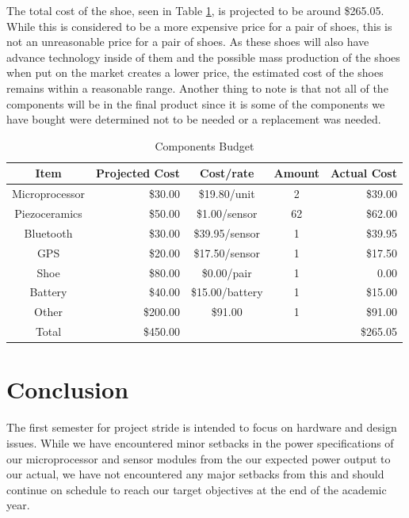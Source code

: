 \documentclass[letterpaper, 12 pt, onecolumn, hidelinks]{ieeetran}
\begin{document}
The total cost of the shoe, seen in Table \ref{table:Components}, is projected to be around \$265.05. While this is considered to be a more expensive price for a pair of shoes, this is not an unreasonable price for a pair of shoes. As these shoes will also have advance technology inside of them and the possible mass production of the shoes when put on the market creates a lower price, the estimated cost of the shoes remains within a reasonable range. Another thing to note is that not all of the components will be in the final product since it is some of the components we have bought were determined not to be needed or a replacement was needed.

\begin{table}[h!]
	\caption{\label{table:Components}Components Budget}
	\begin{center}
		\begin{tabular}{ c|r c c r } 
			Item & Projected Cost & Cost/rate & Amount & Actual Cost \\
			\hline
			Microprocessor & \$30.00 & \$19.80/unit & 2 & \$39.00 \\ 
			Piezoceramics & \$50.00 & \$1.00/sensor & 62 & \$62.00 \\ 
			Bluetooth & \$30.00 & \$39.95/sensor & 1 & \$39.95 \\ 
			GPS & \$20.00 & \$17.50/sensor & 1 & \$17.50 \\ 
			Shoe & \$80.00 & \$0.00/pair & 1 & 0.00 \\ 
			Battery & \$40.00 & \$15.00/battery & 1 & \$15.00 \\ 
			Other & \$200.00 & \$91.00 & 1 & \$91.00 \\ 
			\hline
			Total & \$450.00 &  &  & \$265.05 \\
		\end{tabular}
	\end{center} 
\end{table}

\section{Conclusion}\label{sec:Conclusion}
The first semester for project stride is intended to focus on hardware and design issues. While we have encountered minor setbacks in the power specifications of our microprocessor and sensor modules from the our expected power output to our actual, we have not encountered any major setbacks from this and should continue on schedule to reach our target objectives at the end of the academic year.
    
\end{document}
